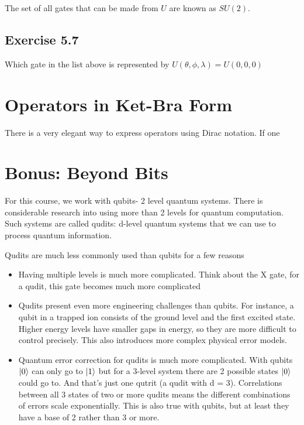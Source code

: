 \documentclass{book}
\begin{document}
The set of all gates that can be made from $U$ are known as $SU(2)$. \newline

\subsection{Exercise 5.7}
Which gate in the list above is represented by  $U(\theta, \phi, \lambda) = U(0,0,0)$ \newline 


\section{ Operators in Ket-Bra Form}

There is a very elegant way to express operators using Dirac notation. If one 

\section{ Bonus: Beyond Bits }

For this course, we work with qubits- 2 level quantum systems. There is considerable research into using more than 2 levels for quantum computation. Such systems are called qudits: d-level quantum systems that we can use to process quantum information. 

Qudits are much less commonly used than qubits for a few reasons
\begin{itemize}
\item Having multiple levels is much more complicated. Think about the X gate, for a qudit, this gate becomes much more complicated

\item Qudits present even more engineering challenges than qubits. For instance, a qubit in a trapped ion consists of the ground level and the first excited state. Higher energy levels have smaller gaps in energy, so they are more difficult to control precisely. This also introduces more complex physical error models. 

\item Quantum error correction for qudits is much more complicated. With qubits $\ket{0}$ can only go to $\ket{1}$ but for a 3-level system there are 2 possible states $\ket{0}$ could go to. And that's just one qutrit (a qudit with d = 3). Correlations between all 3 states of two or more qudits means the different combinations of errors scale exponentially. This is also true with qubits, but at least they have a base of 2 rather than 3 or more.
\end{itemize}
\end{document}
